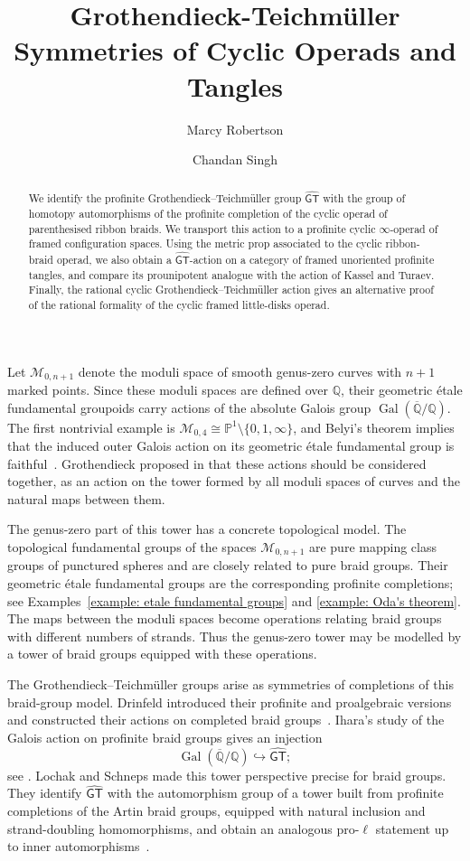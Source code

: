 \documentclass{amsart}
\title[GT Symmetries of Cyclic Operads and Tangles]{Grothendieck-Teichm\"uller Symmetries of Cyclic Operads and Tangles}
\author[M. Robertson]{Marcy Robertson}
\author[C. Singh]{Chandan Singh}
\newcommand{\GT}{\widehat{\mathsf{GT}}}
\theoremstyle{definition}
\numberwithin{equation}{section}
\begin{document}
\begin{abstract}
We identify the profinite Grothendieck--Teichmüller group $\GT$ with the group of homotopy automorphisms of the profinite completion of the cyclic operad of parenthesised ribbon braids. We transport this action to a profinite cyclic $\infty$-operad of framed configuration spaces. Using the metric prop associated to the cyclic ribbon-braid operad, we also obtain a $\GT$-action on a category of framed unoriented profinite tangles, and compare its prounipotent analogue with the action of Kassel and Turaev. Finally, the rational cyclic Grothendieck--Teichmüller action gives an alternative proof of the rational formality of the cyclic framed little-disks operad.
\end{abstract}


\maketitle

Let $\mathcal M_{0,n+1}$ denote the moduli space of smooth
genus-zero curves with $n+1$ marked points. Since these moduli spaces
are defined over $\mathbb Q$, their geometric étale fundamental
groupoids carry actions of the absolute Galois group
$\operatorname{Gal}(\overline{\mathbb Q}/\mathbb Q)$. The first
nontrivial example is
$\mathcal M_{0,4}\cong
\mathbb P^1\setminus\{0,1,\infty\}$, and Belyi's theorem implies that
the induced outer Galois action on its geometric étale fundamental
group is faithful~\cite{belyi}. Grothendieck proposed in
\cite{grothendieck_esquisse} that these actions should be considered
together, as an action on the tower formed by all moduli spaces of
curves and the natural maps between them.

The genus-zero part of this tower has a concrete topological model.
The topological fundamental groups of the spaces
$\mathcal M_{0,n+1}$ are pure mapping class groups of punctured
spheres and are closely related to pure braid groups. Their geometric
étale fundamental groups are the corresponding profinite
completions; see
Examples~\ref{example: etale fundamental groups} and
\ref{example: Oda's theorem}. The maps between the moduli spaces
become operations relating braid groups with different numbers of
strands. Thus the genus-zero tower may be modelled by a tower of braid
groups equipped with these operations.

The Grothendieck--Teichmüller groups arise as symmetries of
completions of this braid-group model. Drinfeld introduced their
profinite and proalgebraic versions and constructed their actions on
completed braid groups~\cite{Drin}. Ihara's study of the Galois
action on profinite braid groups gives an injection
\[
\operatorname{Gal}(\overline{\mathbb Q}/\mathbb Q)
\hookrightarrow\GT;
\]
see \cite{ihara}. Lochak and Schneps made this tower perspective
precise for braid groups. They identify $\GT$ with the automorphism
group of a tower built from profinite completions of the Artin braid
groups, equipped with natural inclusion and strand-doubling
homomorphisms, and obtain an analogous pro-$\ell$ statement up to
inner automorphisms~\cite{ls}.
\end{document}

